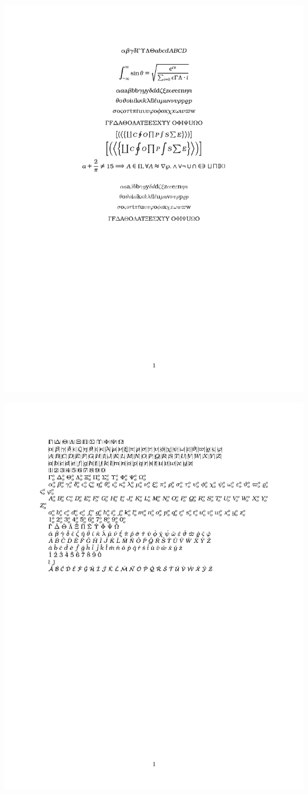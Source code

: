 \documentclass[twocolumn]{article}
\begin{document}
 \noindent\includegraphics*{../results/bookman-font}\par
{} \noindent\includegraphics*{../results/bookman-pos}\par
\end{document}
